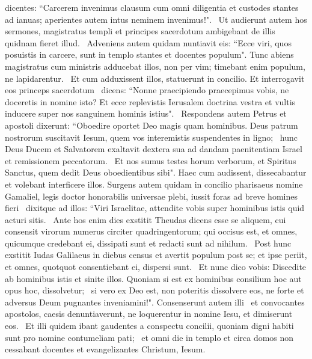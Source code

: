 \begin{biblechapter}
\verse dicentes: “Carcerem invenimus clausum cum omni diligentia et custodes stantes ad ianuas; aperientes autem intus neminem invenimus!".  
\verse Ut audierunt autem hos sermones, magistratus templi et principes sacerdotum ambigebant de illis quidnam fieret illud.  
\verse Adveniens autem quidam nuntiavit eis: “Ecce viri, quos posuistis in carcere, sunt in templo stantes et docentes populum". 
\verse Tunc abiens magistratus cum ministris adducebat illos, non per vim; timebant enim populum, ne lapidarentur.  
\verse Et cum adduxissent illos, statuerunt in concilio. Et interrogavit eos princeps sacerdotum  
\verse dicens: “Nonne praecipiendo praecepimus vobis, ne doceretis in nomine isto? Et ecce replevistis Ierusalem doctrina vestra et vultis inducere super nos sanguinem hominis istius".  
\verse Respondens autem Petrus et apostoli dixerunt: “Oboedire oportet Deo magis quam hominibus.
\verse Deus patrum nostrorum suscitavit Iesum, quem vos interemistis suspendentes in ligno;  
\verse hunc Deus Ducem et Salvatorem exaltavit dextera sua ad dandam paenitentiam Israel et remissionem peccatorum.  
\verse Et nos sumus testes horum verborum, et Spiritus Sanctus, quem dedit Deus oboedientibus sibi".
\verse Haec cum audissent, dissecabantur et volebant interficere illos.
\verse Surgens autem quidam in concilio pharisaeus nomine Gamaliel, legis doctor honorabilis universae plebi, iussit foras ad breve homines fieri  
\verse dixitque ad illos: “Viri Israelitae, attendite vobis super hominibus istis quid acturi sitis.  
\verse Ante hos enim dies exstitit Theudas dicens esse se aliquem, cui consensit virorum numerus circiter quadringentorum; qui occisus est, et omnes, quicumque credebant ei, dissipati sunt et redacti sunt ad nihilum.  
\verse Post hunc exstitit Iudas Galilaeus in diebus census et avertit populum post se; et ipse periit, et omnes, quotquot consentiebant ei, dispersi sunt.  
\verse Et nunc dico vobis: Discedite ab hominibus istis et sinite illos. Quoniam si est ex hominibus consilium hoc aut opus hoc, dissolvetur;  
\verse si vero ex Deo est, non poteritis dissolvere eos, ne forte et adversus Deum pugnantes inveniamini!". Consenserunt autem illi  
\verse et convocantes apostolos, caesis denuntiaverunt, ne loquerentur in nomine Iesu, et dimiserunt eos.  
\verse Et illi quidem ibant gaudentes a conspectu concilii, quoniam digni habiti sunt pro nomine contumeliam pati;  
\verse et omni die in templo et circa domos non cessabant docentes et evangelizantes Christum, Iesum. 
\end{biblechapter}

